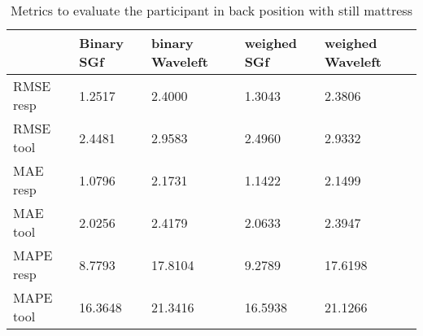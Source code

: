 \begin{table}
\centering
\begin{tabular}{|lllll|}
\hline 
& Binary SGf & binary Waveleft & weighed  SGf & weighed Waveleft \\ 
\hline 
RMSE resp & 
    1.2517  &  2.4000  &  1.3043  &  2.3806 \\ 
RMSE tool &      2.4481  &  2.9583   & 2.4960  &  2.9332 \\ 
MAE resp & 1.0796 &   2.1731 &     1.1422 &  2.1499 \\ 
MAE tool &     2.0256 & 2.4179 & 2.0633 &  2.3947 \\ 
MAPE resp & 8.7793 & 17.8104 & 9.2789 & 17.6198 \\ 
MAPE tool & 16.3648 & 21.3416 & 16.5938 & 21.1266 \\ 
\hline 
\end{tabular}

\caption{Metrics to evaluate the participant in back position with still mattress}
\end{table}

